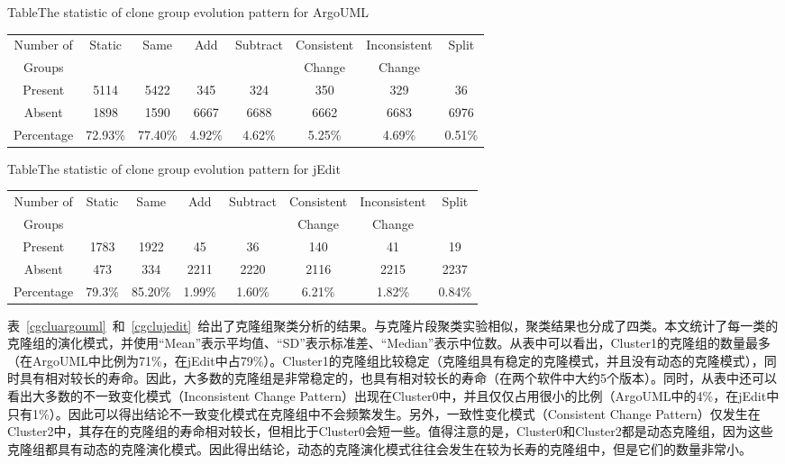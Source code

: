 \begin{table}[htbp]
{Table$\!$}{The statistic of clone group evolution pattern for ArgoUML}
\vspace{0.5em}
\centering
\wuhao
\begin{tabular}{cccccccc}
\toprule[1.5pt]
Number of&\multirow{2}{*}{Static}&\multirow{2}{*}{Same}&\multirow{2}{*}{Add}&\multirow{2}{*}{Subtract}&Consistent&Inconsistent&\multirow{2}{*}{Split}\\ 
Groups&&&&&Change&Change&\\ 
\midrule[1pt]
Present	&5114	&5422	&345	&324	&350	&329	&36\\ 
Absent	&1898	&1590	&6667	&6688	&6662	&6683	&6976\\ 
Percentage	&72.93\%	&77.40\%	&4.92\%	&4.62\%	&5.25\%	&4.69\%	&0.51\%\\ 
\bottomrule[1.5pt]
\end{tabular}
\end{table}

\begin{table}[htbp]
{Table$\!$}{The statistic of clone group evolution pattern for jEdit}
\vspace{0.5em}
\centering
\wuhao
\begin{tabular}{cccccccc}
\toprule[1.5pt]
Number of&\multirow{2}{*}{Static}&\multirow{2}{*}{Same}&\multirow{2}{*}{Add}&\multirow{2}{*}{Subtract}&Consistent&Inconsistent&\multirow{2}{*}{Split}\\ 
Groups&&&&&Change&Change&\\ 
\midrule[1pt]
Present	&1783	&1922	&45	&36	&140	&41	&19\\ 
Absent	&473	&334	&2211	&2220	&2116	&2215	&2237\\ 
Percentage	&79.3\%	&85.20\%	&1.99\%	&1.60\%	&6.21\%	&1.82\%	&0.84\%\\ 
\bottomrule[1.5pt]
\end{tabular}
\end{table}

表~\ref{cgcluargouml}~和~\ref{cgclujedit}~给出了克隆组聚类分析的结果。与克隆片段聚类实验相似，聚类结果也分成了四类。本文统计了每一类的克隆组的演化模式，并使用“Mean”表示平均值、“SD”表示标准差、“Median”表示中位数。从表中可以看出，Cluster1的克隆组的数量最多（在ArgoUML中比例为71\%，在jEdit中占79\%）。Cluster1的克隆组比较稳定（克隆组具有稳定的克隆模式，并且没有动态的克隆模式），同时具有相对较长的寿命。因此，大多数的克隆组是非常稳定的，也具有相对较长的寿命（在两个软件中大约5个版本）。同时，从表中还可以看出大多数的{不一致变化模式（Inconsistent Change Pattern）}出现在Cluster0中，并且仅仅占用很小的比例（ArgoUML中的4\%，在jEdit中只有1\%）。因此可以得出结论不一致变化模式在克隆组中不会频繁发生。另外，一致性变化模式（Consistent Change Pattern）仅发生在Cluster2中，其存在的克隆组的寿命相对较长，但相比于Cluster0会短一些。值得注意的是，Cluster0和Cluster2都是动态克隆组，因为这些克隆组都具有动态的克隆演化模式。因此得出结论，动态的克隆演化模式往往会发生在较为长寿的克隆组中，但是它们的数量非常小。

